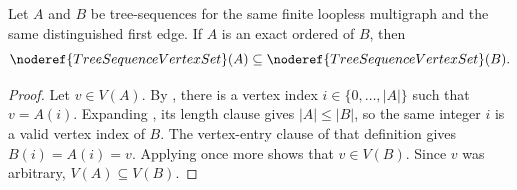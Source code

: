 \begin{lemma}
Let $A$ and $B$ be tree-sequences for the same finite loopless multigraph
and the same distinguished first edge.  If $A$ is an exact ordered
 of $B$, then
\[
  \noderef{TreeSequenceVertexSet}(A)
  \subseteq \noderef{TreeSequenceVertexSet}(B).
\]
\end{lemma}
\begin{proof}
Let $v\in V(A)$.  By , there is a vertex
index $i\in\{0,\ldots,|A|\}$ such that $v=A(i)$.  Expanding
, its length clause gives
$|A|\leq |B|$, so the same integer $i$ is a valid vertex index of $B$.
The vertex-entry clause of that definition gives $B(i)=A(i)=v$.
Applying  once more shows that $v\in V(B)$.
Since $v$ was arbitrary, $V(A)\subseteq V(B)$.
\end{proof}
